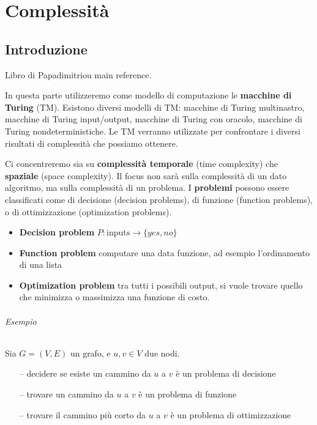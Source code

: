 \part{Complessità}


\chapter{Introduzione}

Libro di Papadimitriou main reference.

In questa parte utilizzeremo come modello di computazione le \textbf{macchine di Turing} (TM). Esistono diversi modelli di TM: macchine di Turing multinastro, macchine di Turing input/output, macchine di Turing con oracolo, macchine di Turing nondeterministiche. Le TM verranno utilizzate per confrontare i diversi risultati di complessità che possiamo ottenere.

Ci concentreremo sia su \textbf{complessità temporale} (time complexity) che \textbf{spaziale} (space complexity). Il focus non sarà sulla complessità di un dato algoritmo, ma sulla complessità di un problema. I \textbf{problemi} possono essere classificati come di decisione (decision problems), di funzione (function problems), o di ottimizzazione (optimization problems).
\begin{itemize}
    \item \textbf{Decision problem} $P:\text{inputs}\to\{yes,no\}$
    \item \textbf{Function problem} computare una data funzione, ad esempio l'ordinamento di una lista
    \item \textbf{Optimization problem} tra tutti i possibili output, si vuole trovare quello che minimizza o massimizza una funzione di costo. 
\end{itemize}

\paragraph{Esempio} Sia $G=(V,E)$ un grafo, e $u,v\in V$ due nodi. 
\begin{itemize}
    \item[--] decidere se esiste un cammino da $u$ a $v$ è un problema di decisione
    \item[--] trovare un cammino da $u$ a $v$ è un problema di funzione
    \item[--] trovare il cammino più corto da $u$ a $v$ è un problema di ottimizzazione
\end{itemize}

